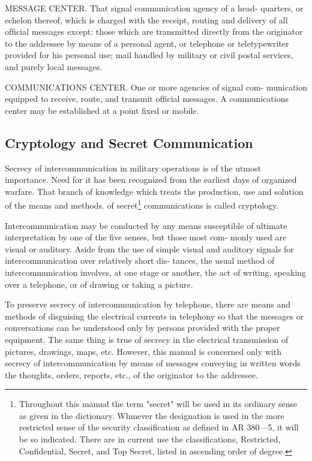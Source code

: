 \mypara MESSAGE CENTER. That signal communication agency of a head-
quarters, or echelon thereof, which is charged with the receipt, routing
and delivery of all ofﬁcial messages except: those which are transmitted
directly from the originator to the addressee by means of a personal
agent, or telephone or teletypewriter provided for his personal use; mail
handled by military or civil postal services, and purely local messages.

\mypara COMMUNICATIONS CENTER. One or more agencies of signal com-
munication equipped to receive, route, and transmit ofﬁcial messages. A
communications center may be established at a point ﬁxed or mobile.

\subsection{Cryptology and Secret Communication}

\mypara Secrecy of intercommunication in military operations is of the
utmost importance. Need for it has been recognized from the earliest
days of organized warfare. That branch of knowledge which treats the
production, use and solution of the means and methods. of secret\footnote{ Throughout this manual the term "secret" will be used in its ordinary sense as given in the dictionary. Whmever the designation is used in the more restricted sense of the security classiﬁcation as deﬁned in AR 380—5, it will be so indicated. There are in current use the classiﬁcations, Restricted, Conﬁdential, Secret, and Top Secret, listed in ascending order of degree.} communications is called cryptology.


\mypara Intercommunication may be conducted by any means susceptible of
ultimate interpretation by one of the ﬁve senses, but those most com-
monly used are visual or auditory. Aside from the use of simple visual
and auditory signals for intercommunication over relatively short dis-
tances, the usual method of intercommunication involves, at one stage
or another, the act of writing, speaking over a telephone, or of drawing
or taking a picture.

\mypara To preserve secrecy of intercommunication by telephone, there are
means and methods of disguising the electrical currents in telephony so
that the messages or conversations can be understood only by persons
provided with the proper equipment. The same thing is true of secrecy
in the electrical transmission of pictures, drawings, maps, etc. However,
this manual is concerned only with secrecy of intercommunication by
means of messages conveying in written words the thoughts, orders,
reports, etc., of the originator to the addressee.

